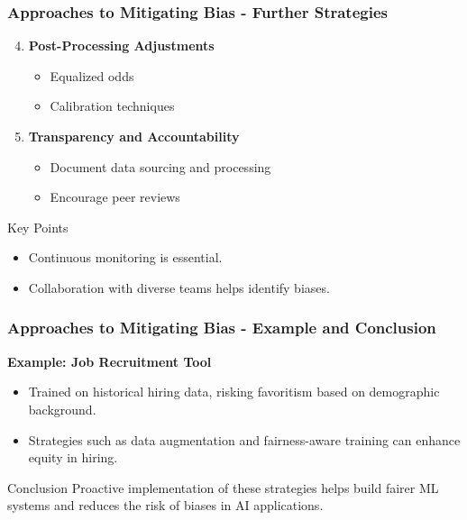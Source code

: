 \documentclass{beamer}
\begin{document}
\begin{frame}[fragile]
    \frametitle{Approaches to Mitigating Bias - Further Strategies}
    \begin{enumerate}
        \setcounter{enumi}{3}
        \item \textbf{Post-Processing Adjustments}
            \begin{itemize}
                \item Equalized odds
                \item Calibration techniques
            \end{itemize}

        \item \textbf{Transparency and Accountability}
            \begin{itemize}
                \item Document data sourcing and processing
                \item Encourage peer reviews
            \end{itemize}
    \end{enumerate}
    
    \begin{block}{Key Points}
        \begin{itemize}
            \item Continuous monitoring is essential.
            \item Collaboration with diverse teams helps identify biases.
        \end{itemize}
    \end{block}
\end{frame}

\begin{frame}[fragile]
    \frametitle{Approaches to Mitigating Bias - Example and Conclusion}
    \textbf{Example: Job Recruitment Tool}
    \begin{itemize}
        \item Trained on historical hiring data, risking favoritism based on demographic background.
        \item Strategies such as data augmentation and fairness-aware training can enhance equity in hiring.
    \end{itemize}

    \begin{block}{Conclusion}
        Proactive implementation of these strategies helps build fairer ML systems and reduces the risk of biases in AI applications.
    \end{block}
\end{frame}
\end{document}
